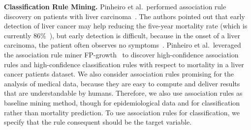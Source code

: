 \documentclass[
]{book}
\begin{document}
\textbf{Classification Rule Mining.} Pinheiro et al.~performed association rule discovery on patients with liver carcinoma~\autocite{PinheiroEtAl:ICCABS13}.
The authors pointed out that early detection of liver cancer may help reducing the five-year mortality rate (which is currently 86\%~\autocite{PinheiroEtAl:ICCABS13}), but early detection is difficult, because in the onset of a liver carcinoma, the patient often observes no symptoms~\autocite{PinheiroEtAl:ICCABS13}.
Pinheiro et al.~leveraged the association rule miner FP-growth~\autocite{HanEtAl:FP-Growth} to discover high-confidence association rules and high-confidence classification rules with respect to mortality in a liver cancer patients dataset. We also consider association rules promising for the analysis of medical data, because they are easy to compute and deliver results that are understandable by humans. Therefore, we also use association rules as baseline mining method, though for epidemiological data and for classification rather than mortality prediction. To use association rules for classification, we specify that the rule consequent should be the target variable.
\end{document}
